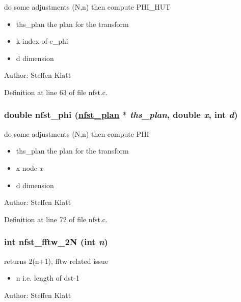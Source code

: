 do some adjustments (N,n) then compute PHI\_\-HUT 

\begin{itemize}
\item ths\_\-plan the plan for the transform \item k index of c\_\-phi \item d dimension\end{itemize}
\begin{Desc}
\item[Author:]Steffen Klatt \end{Desc}


Definition at line 63 of file nfst.c.\hypertarget{group__nfsct_ga29}{
\subsubsection[nfst\_\-phi]{\setlength{\rightskip}{0pt plus 5cm}double nfst\_\-phi (\hyperlink{structnfst__plan}{nfst\_\-plan} $\ast$ {\em ths\_\-plan}, double {\em x}, int {\em d})}}
\label{group__nfsct_ga29}


do some adjustments (N,n) then compute PHI 

\begin{itemize}
\item ths\_\-plan the plan for the transform \item x node $x$ \item d dimension\end{itemize}
\begin{Desc}
\item[Author:]Steffen Klatt \end{Desc}


Definition at line 72 of file nfst.c.\hypertarget{group__nfsct_ga30}{
\subsubsection[nfst\_\-fftw\_\-2N]{\setlength{\rightskip}{0pt plus 5cm}int nfst\_\-fftw\_\-2N (int {\em n})}}
\label{group__nfsct_ga30}


returns 2(n+1), fftw related issue 

\begin{itemize}
\item n i.e. length of dst-1\end{itemize}
\begin{Desc}
\item[Author:]Steffen Klatt \end{Desc}


